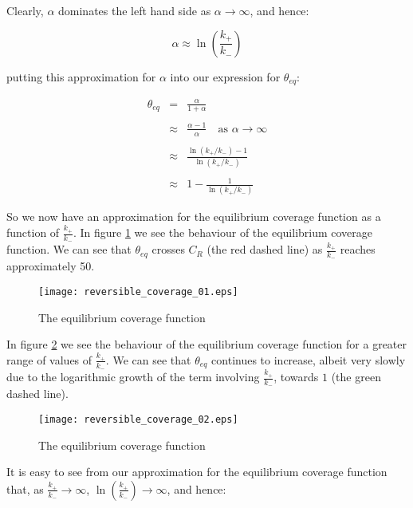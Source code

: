 Clearly, $\alpha$ dominates the left hand side as $\alpha \to \infty$, 
and hence: \bigskip

\[
	\alpha \approx \ln \left( \frac{k_{+}}{k_{-}} \right)
\]\medskip

putting this approximation for $\alpha$ into our expression for 
$\theta_{eq}$: \bigskip 

\begin{eqnarray*}
	\theta_{eq} & =       & \frac{\alpha}{1 + \alpha} \\\\
				& \approx & \frac{\alpha - 1}{\alpha} \quad \text{as } \alpha \to \infty \\\\
				& \approx & \frac{\ln(k_{+}/k_{-}) - 1}{\ln(k_{+}/k_{-})} \\\\
				& \approx & 1 - \frac{1}{\ln(k_{+}/k_{-})} 
\end{eqnarray*}\medskip

So we now have an approximation for the equilibrium coverage function as a 
function of $\frac{k_{+}}{k_{-}}$. In figure \ref{fig:ecf1} we see the behaviour 
of the equilibrium coverage function. We can see that $\theta_{eq}$ crosses $C_R$ 
(the red dashed line) as $\frac{k_{+}}{k_{-}}$ reaches approximately 50. \bigskip

\begin{figure}[h!]
	\centering
	\texttt{[image: reversible\_coverage\_01.eps]}
	\caption{The equilibrium coverage function}
	\label{fig:ecf1}
\end{figure}\medskip

In figure \ref{fig:ecf2} we see the behaviour of the equilibrium coverage 
function for a greater range of values of $\frac{k_{+}}{k_{-}}$. We can 
see that $\theta_{eq}$ continues to increase, albeit very slowly due to the 
logarithmic growth of the term involving $\frac{k_{+}}{k_{-}}$, towards $1$ 
(the green dashed line). \bigskip

\begin{figure}[h!]
	\centering
	\texttt{[image: reversible\_coverage\_02.eps]}
	\caption{The equilibrium coverage function}
	\label{fig:ecf2}
\end{figure}\medskip

It is easy to see from our approximation for the equilibrium coverage 
function that, as $\frac{k_{+}}{k_{-}} \to \infty$, 
$\ln\left(\frac{k_{+}}{k_{-}}\right) \to \infty$, and hence: \bigskip

